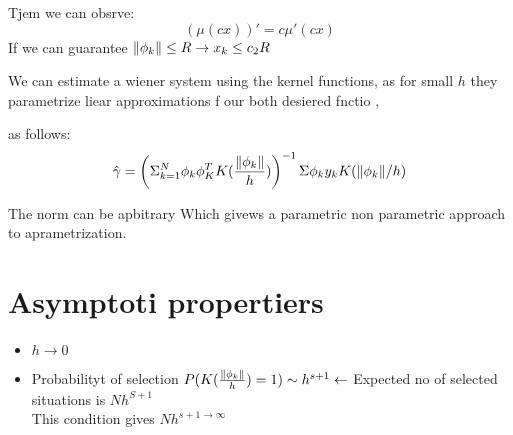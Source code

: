 Tjem we can obsrve:
\begin{equation}
    (\mu(cx) )'= c\mu'(cx)
\end{equation}
If we can guarantee $\lVert\phi_k\rVert \le R \rightarrow x_k \le c_2R$ 

We can estimate a wiener system using the kernel functions, as for small $h$ they parametrize liear approximations f our both desiered fnctio ,\

as follows:
\begin{equation}
    \hat{\gamma} = \left( \Sigma_{k=1}^{N}\phi_k\phi_K^{T}K(\frac{\lVert\phi_k\rVert}{h}  )\right)^{-1}\Sigma\phi_k y_k K(\lVert\phi_k\rVert/h)
\end{equation}

The norm can be apbitrary
Which givews a parametric non parametric approach to aprametrization.

\section{Asymptoti propertiers}

 \begin{itemize}
        \item $h \rightarrow  0$
        \item Probabilityt of selection $P(K(\frac{\lVert\phi_k\rVert}{h}) = 1) \sim h^{s+1} \leftarrow$ Expected no of selected situations is $Nh^{S+1}$\\
            This condition gives $Nh^{s+1 \rightarrow \infty}$
\end{itemize}




